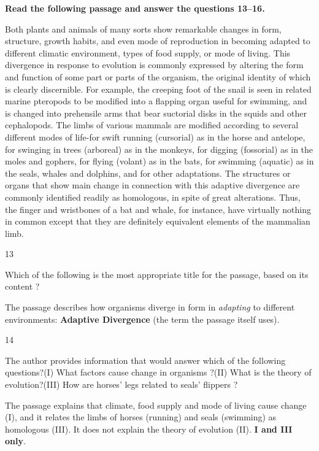 \begin{context}
\textbf{Read the following passage and answer the questions 13--16.}\par\smallskip
Both plants and animals of many sorts show remarkable changes in form, structure, growth habits, and even mode of reproduction in becoming adapted to different climatic environment, types of food supply, or mode of living. This divergence in response to evolution is commonly expressed by altering the form and function of some part or parts of the organism, the original identity of which is clearly discernible. For example, the creeping foot of the snail is seen in related marine pteropods to be modified into a flapping organ useful for swimming, and is changed into prehensile arms that bear suctorial disks in the squids and other cephalopods. The limbs of various mammals are modified according to several different modes of life-for swift running (cursorial) as in the horse and antelope, for swinging in trees (arboreal) as in the monkeys, for digging (fossorial) as in the moles and gophers, for flying (volant) as in the bats, for swimming (aquatic) as in the seals, whales and dolphins, and for other adaptations. The structures or organs that show main change in connection with this adaptive divergence are commonly identified readily as homologous, in spite of great alterations. Thus, the finger and wristbones of a bat and whale, for instance, have virtually nothing in common except that they are definitely equivalent elements of the mammalian limb.
\end{context}
\begin{question}{13}
{Which of the following is the most appropriate title for the passage, based on its content ?\par}
\begin{explain}
The passage describes how organisms diverge in form in \emph{adapting} to different environments: \textbf{Adaptive Divergence} (the term the passage itself uses).
\end{explain}
\end{question}

\begin{question}{14}
{The author provides information that would answer which of the following questions?\newline (I) What factors cause change in organisms ?\newline (II) What is the theory of evolution?\newline (III) How are horses' legs related to seals' flippers ?\par}
\begin{explain}
The passage explains that climate, food supply and mode of living cause change (I), and it relates the limbs of horses (running) and seals (swimming) as homologous (III). It does not explain the theory of evolution (II). \textbf{I and III only}.
\end{explain}
\end{question}

